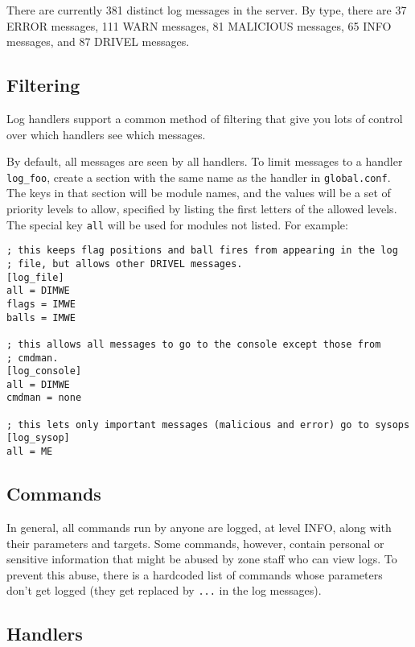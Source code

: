 \documentclass{article}
\begin{document}
There are currently
381
distinct log messages in the server. By type, there are 37 ERROR
messages, 111 WARN messages, 81 MALICIOUS messages, 65 INFO messages, and
87 DRIVEL messages.

\subsection{Filtering}

Log handlers support a common method of filtering that give you lots of
control over which handlers see which messages.

By default, all messages are seen by all handlers. To limit messages to
a handler \verb/log_foo/, create a section with the same name as the
handler in \verb/global.conf/. The keys in that section will be module
names, and the values will be a set of priority levels to allow,
specified by listing the first letters of the allowed levels. The
special key \verb/all/ will be used for modules not listed. For example:

\begin{verbatim}
; this keeps flag positions and ball fires from appearing in the log
; file, but allows other DRIVEL messages.
[log_file]
all = DIMWE
flags = IMWE
balls = IMWE

; this allows all messages to go to the console except those from
; cmdman.
[log_console]
all = DIMWE
cmdman = none

; this lets only important messages (malicious and error) go to sysops
[log_sysop]
all = ME
\end{verbatim}


\subsection{Commands}

In general, all commands run by anyone are logged, at level INFO, along
with their parameters and targets. Some commands, however, contain
personal or sensitive information that might be abused by zone staff who
can view logs. To prevent this abuse, there is a hardcoded list of
commands whose parameters don't get logged (they get replaced by
\verb/.../ in the log messages).


\subsection{Handlers}
\end{document}
